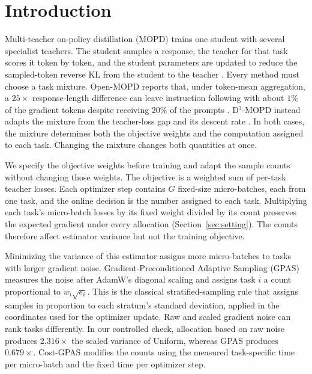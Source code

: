 \section{Introduction}
\label{sec:intro}

Multi-teacher on-policy distillation (MOPD) trains one student with several
specialist teachers. The student samples a response, the teacher for that task
scores it token by token, and the student parameters are updated to reduce the
sampled-token reverse KL from the student to the teacher
\citep{ma2026mopdmultiteacheronpolicydistillation}. Every method must choose a
task mixture. Open-MOPD
reports that, under token-mean aggregation, a $25\times$ response-length
difference can leave instruction following with about $1\%$ of the gradient
tokens despite receiving $20\%$ of the prompts
\citep{gao2026openmopddiagnosingfixingcapability}. D$^3$-MOPD instead adapts
the mixture from the teacher-loss gap and its descent rate
\citep{sun2026d3mopd}. In both cases, the mixture determines both the objective
weights and the computation assigned to each task. Changing the mixture changes
both quantities at once.

We specify the objective weights before training and adapt the sample counts
without changing those weights. The objective is a weighted sum of per-task
teacher losses. Each optimizer step contains $G$ fixed-size micro-batches, each
from one task, and the online decision is the number assigned to each task.
Multiplying each task's micro-batch losses by its fixed weight divided by its
count preserves the expected gradient under every allocation
(Section~\ref{sec:setting}). The counts therefore affect estimator variance but
not the training objective.

Minimizing the variance of this estimator assigns more micro-batches to tasks
with larger gradient noise. Gradient-Preconditioned Adaptive Sampling (GPAS)
measures the noise after AdamW's diagonal scaling and assigns task $i$ a count
proportional to $w_i\sqrt{e_i}$. This is the classical stratified-sampling rule
that assigns samples in proportion to each stratum's standard deviation,
applied in the coordinates used for the optimizer update. Raw and scaled
gradient noise can rank tasks differently. In our controlled check, allocation
based on raw noise produces $2.316\times$ the scaled variance of Uniform,
whereas GPAS produces $0.679\times$. Cost-GPAS modifies the counts using the
measured task-specific time per micro-batch and the fixed time per optimizer
step.

